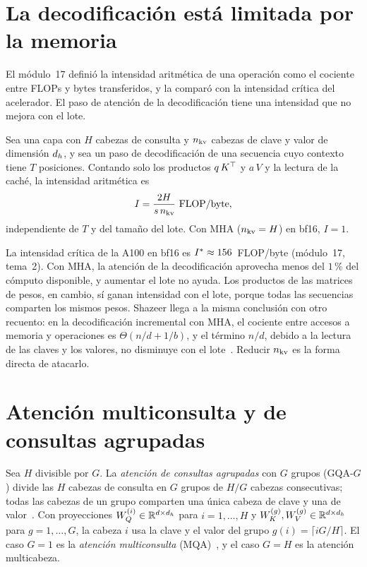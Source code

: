 \addtocounter{definicion}{1}%

\section{La decodificación está limitada por la memoria}

El módulo~17 definió la intensidad aritmética de una operación como el cociente entre FLOPs y bytes transferidos, y la comparó con la intensidad crítica del acelerador. El paso de atención de la decodificación tiene una intensidad que no mejora con el lote.

\begin{proposicion}\label{prop:intensidad}
Sea una capa con $H$ cabezas de consulta y $n_{\mathrm{kv}}$ cabezas de clave y valor de dimensión $d_{h}$, y sea un paso de decodificación de una secuencia cuyo contexto tiene $T$ posiciones. Contando solo los productos $q\,K^{\top}$ y $a\,V$ y la lectura de la caché, la intensidad aritmética es
\[
I=\frac{2H}{s\,n_{\mathrm{kv}}}\ \text{FLOP/byte},
\]
independiente de $T$ y del tamaño del lote. Con MHA ($n_{\mathrm{kv}}=H$) en bf16, $I=1$.
\end{proposicion}

La intensidad crítica de la A100 en bf16 es $I^{\ast}\approx 156$~FLOP/byte (módulo~17, tema~2). Con MHA, la atención de la decodificación aprovecha menos del $1\,\%$ del cómputo disponible, y aumentar el lote no ayuda. Los productos de las matrices de pesos, en cambio, sí ganan intensidad con el lote, porque todas las secuencias comparten los mismos pesos. Shazeer llega a la misma conclusión con otro recuento: en la decodificación incremental con MHA, el cociente entre accesos a memoria y operaciones es $\Theta(n/d+1/b)$, y el término $n/d$, debido a la lectura de las claves y los valores, no disminuye con el lote~\cite[§2.4.1]{mqa}. Reducir $n_{\mathrm{kv}}$ es la forma directa de atacarlo.

\section{Atención multiconsulta y de consultas agrupadas}

\begin{definicion}\label{def:gqa}
Sea $H$ divisible por $G$. La \emph{atención de consultas agrupadas} con $G$ grupos (GQA-$G$) divide las $H$ cabezas de consulta en $G$ grupos de $H/G$ cabezas consecutivas; todas las cabezas de un grupo comparten una única cabeza de clave y una de valor~\cite[§2.2]{gqa}. Con proyecciones $W_Q^{(i)}\in\mathbb{R}^{d\times d_{h}}$ para $i=1,\dots,H$ y $W_K^{(g)},W_V^{(g)}\in\mathbb{R}^{d\times d_{h}}$ para $g=1,\dots,G$, la cabeza $i$ usa la clave y el valor del grupo $g(i)=\lceil iG/H\rceil$. El caso $G=1$ es la \emph{atención multiconsulta} (MQA)~\cite[§3]{mqa}, y el caso $G=H$ es la atención multicabeza.
\end{definicion}

